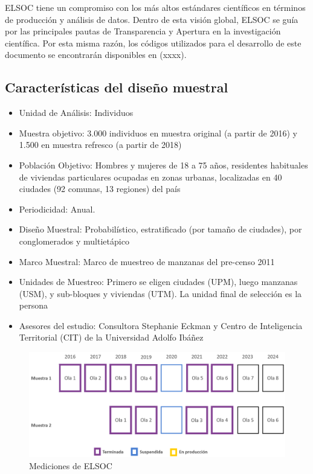 \documentclass[
  12pt,
]{book}
\providecommand{\tightlist}{%
  \setlength{\itemsep}{0pt}\setlength{\parskip}{0pt}}
\begin{document}
ELSOC tiene un compromiso con los más altos estándares científicos en términos de producción y análisis de datos. Dentro de esta visión global, ELSOC se guía por las principales pautas de Transparencia y Apertura en la investigación científica. Por esta misma razón, los códigos utilizados para el desarrollo de este documento se encontrarán disponibles en (xxxx).

\hypertarget{caracteruxedsticas-del-diseuxf1o-muestral}{%
\subsection*{Características del diseño muestral}\label{caracteruxedsticas-del-diseuxf1o-muestral}}

\begin{itemize}
\tightlist
\item
  Unidad de Análisis: Individuos
\item
  Muestra objetivo: 3.000 individuos en muestra original (a partir de 2016) y 1.500 en muestra refresco (a partir de 2018)
\item
  Población Objetivo: Hombres y mujeres de 18 a 75 años, residentes habituales de viviendas particulares ocupadas en zonas urbanas, localizadas en 40 ciudades (92 comunas, 13 regiones) del país
\item
  Periodicidad: Anual.
\item
  Diseño Muestral: Probabilístico, estratificado (por tamaño de ciudades), por conglomerados y multietápico
\item
  Marco Muestral: Marco de muestreo de manzanas del pre-censo 2011
\item
  Unidades de Muestreo: Primero se eligen ciudades (UPM), luego manzanas (USM), y sub-bloques y viviendas (UTM). La unidad final de selección es la persona
\item
  Asesores del estudio: Consultora Stephanie Eckman y Centro de Inteligencia Territorial (CIT) de la Universidad Adolfo Ibáñez
\end{itemize}

\begin{figure}

{\centering \includegraphics[width=1\linewidth,height=1\textheight]{imagenes/olas_elsoc} 

}

\caption{Mediciones de ELSOC}\label{fig:ilust-olas-elsoc}
\end{figure}
\end{document}
